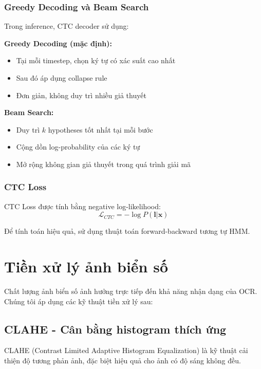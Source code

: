 \subsubsection{Greedy Decoding và Beam Search}
Trong inference, CTC decoder sử dụng:

\textbf{Greedy Decoding (mặc định):}
\begin{itemize}
    \item Tại mỗi timestep, chọn ký tự có xác suất cao nhất
    \item Sau đó áp dụng collapse rule
    \item Đơn giản, không duy trì nhiều giả thuyết
\end{itemize}

\textbf{Beam Search:}
\begin{itemize}
    \item Duy trì $k$ hypotheses tốt nhất tại mỗi bước
    \item Cộng dồn log-probability của các ký tự
    \item Mở rộng không gian giả thuyết trong quá trình giải mã
\end{itemize}

\subsubsection{CTC Loss}
CTC Loss được tính bằng negative log-likelihood:
\begin{equation}
    \mathcal{L}_{CTC} = -\log P(\mathbf{l} | \mathbf{x})
\end{equation}

Để tính toán hiệu quả, sử dụng thuật toán forward-backward tương tự HMM.

\section{Tiền xử lý ảnh biển số}

Chất lượng ảnh biển số ảnh hưởng trực tiếp đến khả năng nhận dạng của OCR. Chúng tôi áp dụng các kỹ thuật tiền xử lý sau:

\subsection{CLAHE - Cân bằng histogram thích ứng}
CLAHE (Contrast Limited Adaptive Histogram Equalization) là kỹ thuật cải thiện độ tương phản ảnh, đặc biệt hiệu quả cho ảnh có độ sáng không đều.

